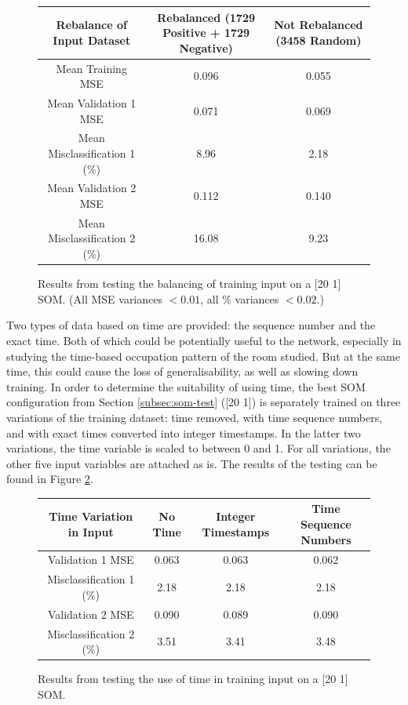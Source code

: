 \documentclass[10pt, oneside]{article}
\begin{document}
\begin{figure}[h]
\begin{center}
\fontsize{9}{11}\selectfont
\begin{tabular}{|c|c|c|}
\hline 
Rebalance of Input Dataset & Rebalanced (1729 Positive + 1729 Negative) & Not Rebalanced (3458 Random) \\ \hline
Mean Training MSE & 0.096 & 0.055 \\ \hline \hline 
Mean Validation 1 MSE & 0.071 & 0.069 \\ \hline 
Mean Misclassification 1 (\%) & 8.96 & 2.18 \\ \hline \hline 
Mean Validation 2 MSE & 0.112 & 0.140 \\ \hline 
Mean Misclassification 2 (\%) & 16.08 & 9.23 \\ \hline
\end{tabular}
\end{center}
\caption{\label{fig:equalize-testing} Results from testing the balancing of training input on a [20 1] SOM. (All MSE variances $<0.01$, all \% variances $<0.02$.)}
\end{figure}

Two types of data based on time are provided: the sequence number and the exact time. Both of which could be potentially useful to the network, especially in studying the time-based occupation pattern of the room studied. But at the same time, this could cause the loss of generalisability, as well as slowing down training. In order to determine the suitability of using time, the best SOM configuration from Section \ref{subsec:som-test} ([20 1]) is separately trained on three variations of the training dataset: time removed, with time sequence numbers, and with exact times converted into integer timestamps. In the latter two variations, the time variable is scaled to between 0 and 1. For all variations, the other five input variables are attached as is. The results of the testing can be found in Figure \ref{fig:time-testing}.

\begin{figure}[h]
\begin{center}
\fontsize{9}{11}\selectfont
\begin{tabular}{|c|c|c|c|}
\hline 
Time Variation in Input & No Time & Integer Timestamps & Time Sequence Numbers \\ \hline \hline 
Validation 1 MSE & 0.063 & 0.063 & 0.062 \\ \hline 
Misclassification 1 (\%) & 2.18 & 2.18 & 2.18 \\ \hline \hline 
Validation 2 MSE &  0.090 & 0.089 & 0.090 \\ \hline 
Misclassification 2 (\%) & 3.51 & 3.41 & 3.48 \\ \hline 
\end{tabular}
\end{center}
\caption{\label{fig:time-testing} Results from testing the use of time in training input on a [20 1] SOM.}
\end{figure}
\end{document}
